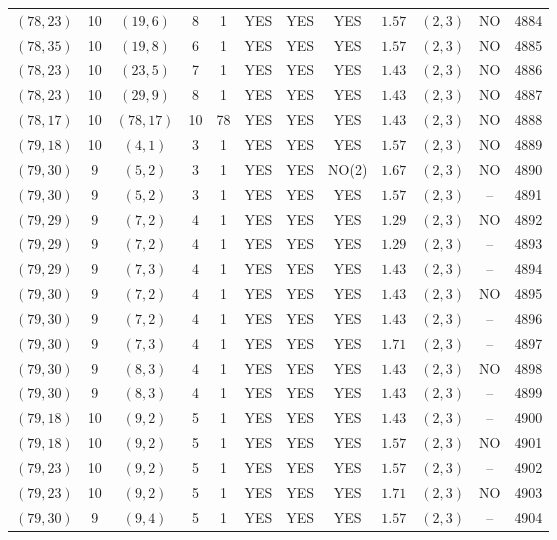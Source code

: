 \begin{longtable}{|c|c|c|c|c|c|c|c|c|c|c|c|}
$(78,23)$ & 10 & $(19,6)$ & 8 & 1 & YES & YES & YES & $1.57$ & $(2,3)$ & NO & 4884\\
$(78,35)$ & 10 & $(19,8)$ & 6 & 1 & YES & YES & YES & $1.57$ & $(2,3)$ & NO & 4885\\
$(78,23)$ & 10 & $(23,5)$ & 7 & 1 & YES & YES & YES & $1.43$ & $(2,3)$ & NO & 4886\\
$(78,23)$ & 10 & $(29,9)$ & 8 & 1 & YES & YES & YES & $1.43$ & $(2,3)$ & NO & 4887\\
$(78,17)$ & 10 & $(78,17)$ & 10 & 78 & YES & YES & YES & $1.43$ & $(2,3)$ & NO & 4888\\
$(79,18)$ & 10 & $(4,1)$ & 3 & 1 & YES & YES & YES & $1.57$ & $(2,3)$ & NO & 4889\\
$(79,30)$ & 9 & $(5,2)$ & 3 & 1 & YES & YES & NO(2) & $1.67$ & $(2,3)$ & NO & 4890\\
$(79,30)$ & 9 & $(5,2)$ & 3 & 1 & YES & YES & YES & $1.57$ & $(2,3)$ & -- & 4891\\
$(79,29)$ & 9 & $(7,2)$ & 4 & 1 & YES & YES & YES & $1.29$ & $(2,3)$ & NO & 4892\\
$(79,29)$ & 9 & $(7,2)$ & 4 & 1 & YES & YES & YES & $1.29$ & $(2,3)$ & -- & 4893\\
$(79,29)$ & 9 & $(7,3)$ & 4 & 1 & YES & YES & YES & $1.43$ & $(2,3)$ & -- & 4894\\
$(79,30)$ & 9 & $(7,2)$ & 4 & 1 & YES & YES & YES & $1.43$ & $(2,3)$ & NO & 4895\\
$(79,30)$ & 9 & $(7,2)$ & 4 & 1 & YES & YES & YES & $1.43$ & $(2,3)$ & -- & 4896\\
$(79,30)$ & 9 & $(7,3)$ & 4 & 1 & YES & YES & YES & $1.71$ & $(2,3)$ & -- & 4897\\
$(79,30)$ & 9 & $(8,3)$ & 4 & 1 & YES & YES & YES & $1.43$ & $(2,3)$ & NO & 4898\\
$(79,30)$ & 9 & $(8,3)$ & 4 & 1 & YES & YES & YES & $1.43$ & $(2,3)$ & -- & 4899\\
$(79,18)$ & 10 & $(9,2)$ & 5 & 1 & YES & YES & YES & $1.43$ & $(2,3)$ & -- & 4900\\
$(79,18)$ & 10 & $(9,2)$ & 5 & 1 & YES & YES & YES & $1.57$ & $(2,3)$ & NO & 4901\\
$(79,23)$ & 10 & $(9,2)$ & 5 & 1 & YES & YES & YES & $1.57$ & $(2,3)$ & -- & 4902\\
$(79,23)$ & 10 & $(9,2)$ & 5 & 1 & YES & YES & YES & $1.71$ & $(2,3)$ & NO & 4903\\
$(79,30)$ & 9 & $(9,4)$ & 5 & 1 & YES & YES & YES & $1.57$ & $(2,3)$ & -- & 4904\\

\end{longtable}
